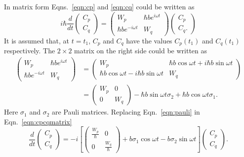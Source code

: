 In matrix form Eqns.~\ref{eqn:cp} and \ref{eqn:cq} could be written as
\begin{equation}
  \label{eqn:cpcqmatrix}
i \hbar \frac{d}{dt}\left(
\begin{array}{cc}
C_p \\
C_q
\end{array} \right) =
\left(
\begin{array}{cc}
W_p & \hbar b e^{i \omega t} \\
\hbar b e^{-i \omega t} & W_q 
\end{array} \right)
\left(
\begin{array}{c}
C_p \\
C_q.
\end{array}\right)
\end{equation}
It is assumed that, at $t=t_1$, $C_p$ and $C_q$ have the values $C_p(t_1)$
and $C_q(t_1)$ respectively.
The $2 \times 2$ matrix on the right side could be written as
\begin{align}
  \label{eqn:pauli}
\left(
\begin{array}{cc}
W_p & \hbar b e^{i\omega t} \\
\hbar b e^{-i\omega t} & W_q 
\end{array}
\right) &=
\left(
\begin{array}{cc}
W_p & \hbar b \cos{\omega t}+i \hbar b \sin{\omega t} \\
\hbar b \cos{\omega t}-i \hbar b \sin{\omega t} & W_q
\end{array}
\right) \\ \nonumber
&= \left(
\begin{array}{cc}
W_p & 0 \\
0 & W_q
\end{array} \right) -\hbar b \sin{\omega t} \sigma_2 +\hbar b \cos{\omega t} \sigma_1.
\end{align}
Here $\sigma_1$ and $\sigma_2$ are Pauli matrices.
Replacing Eqn.~\ref{eqn:pauli} in Eqn.~\ref{eqn:cpcqmatrix}
\begin{equation}
\frac{d}{dt} \left( \begin{array}{c}
C_p \\
C_q
\end{array}\right) =
-i \left[
\left(
\begin{array}{cc}
\frac{W_p}{\hbar} & 0 \\
0 & \frac{W_q}{\hbar}
\end{array}\right)
+ b \sigma_1\cos{\omega t}  -b \sigma_2 \sin{\omega t} 
\right]\left( \begin{array}{c}
C_p \\
C_q
\end{array}\right).
\end{equation}
